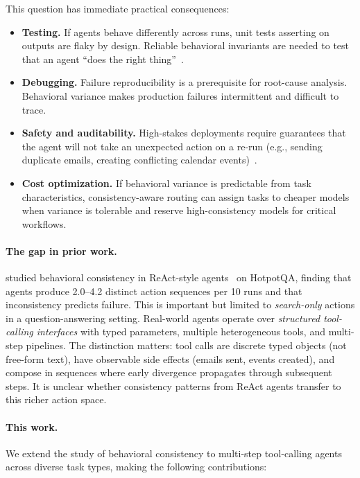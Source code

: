 \documentclass[11pt]{article}
\begin{document}
This question has immediate practical consequences:
\begin{itemize}[leftmargin=1.5em]
  \item \textbf{Testing.} If agents behave differently across runs, unit tests
    asserting on outputs are flaky by design. Reliable behavioral invariants are
    needed to test that an agent ``does the right thing''~\citep{kapoor2024ai}.
  \item \textbf{Debugging.} Failure reproducibility is a prerequisite for root-cause
    analysis. Behavioral variance makes production failures intermittent and
    difficult to trace.
  \item \textbf{Safety and auditability.} High-stakes deployments require
    guarantees that the agent will not take an unexpected action on a re-run
    (e.g., sending duplicate emails, creating conflicting calendar
    events)~\citep{weidinger2021ethical}.
  \item \textbf{Cost optimization.} If behavioral variance is predictable from task
    characteristics, consistency-aware routing can assign tasks to cheaper models
    when variance is tolerable and reserve high-consistency models for critical
    workflows.
\end{itemize}

\paragraph{The gap in prior work.}
\citet{mehta2026disagree} studied behavioral consistency in ReAct-style
agents~\citep{yao2023react} on HotpotQA, finding that agents produce 2.0--4.2
distinct action sequences per 10 runs and that inconsistency predicts failure.
This is important but limited to \emph{search-only} actions in a question-answering
setting. Real-world agents operate over \emph{structured tool-calling interfaces}
with typed parameters, multiple heterogeneous tools, and multi-step pipelines.
The distinction matters: tool calls are discrete typed objects (not free-form text),
have observable side effects (emails sent, events created), and compose in
sequences where early divergence propagates through subsequent steps. It is
unclear whether consistency patterns from ReAct agents transfer to this richer
action space.

\paragraph{This work.}
We extend the study of behavioral consistency to multi-step tool-calling agents
across diverse task types, making the following contributions:
\end{document}
